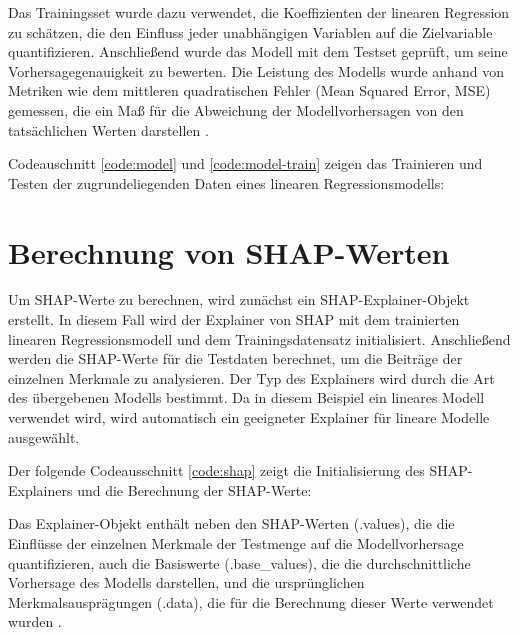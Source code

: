 Das Trainingsset wurde dazu verwendet, die Koeffizienten der linearen Regression zu schätzen, 
die den Einfluss jeder unabhängigen Variablen auf die Zielvariable quantifizieren. 
Anschließend wurde das Modell mit dem Testset geprüft, um seine Vorhersagegenauigkeit zu bewerten. 
Die Leistung des Modells wurde anhand von Metriken wie dem mittleren quadratischen Fehler (Mean Squared Error, MSE) gemessen, 
die ein Maß für die Abweichung der Modellvorhersagen von den tatsächlichen Werten darstellen \cite[S. 40]{Molnar_2022}.

Codeauschnitt \ref{code:model} und \ref{code:model-train} zeigen das Trainieren und Testen der zugrundeliegenden Daten 
eines linearen Regressionsmodells:







\section{Berechnung von SHAP-Werten}

Um SHAP-Werte zu berechnen, wird zunächst ein SHAP-Explainer-Objekt erstellt. In diesem Fall wird der Explainer 
von SHAP mit dem trainierten linearen Regressionsmodell und dem Trainingsdatensatz initialisiert. 
Anschließend werden die SHAP-Werte für die Testdaten berechnet, um die Beiträge der einzelnen Merkmale 
zu analysieren. Der Typ des Explainers wird durch die Art des übergebenen Modells bestimmt. 
Da in diesem Beispiel ein lineares Modell verwendet wird, wird automatisch ein geeigneter Explainer 
für lineare Modelle ausgewählt.

Der folgende Codeausschnitt \ref{code:shap} zeigt die Initialisierung des SHAP-Explainers und die Berechnung der SHAP-Werte:



Das Explainer-Objekt enthält neben den SHAP-Werten (.values), 
die die Einflüsse der einzelnen Merkmale der Testmenge auf die Modellvorhersage quantifizieren, 
auch die Basiswerte (.base\_values), die die durchschnittliche Vorhersage des Modells darstellen, 
und die ursprünglichen Merkmalsausprägungen (.data), die für die Berechnung dieser Werte verwendet wurden \cite[S. 51]{Molnar_2023}.

